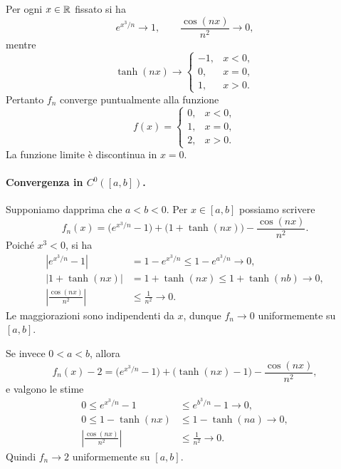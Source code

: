 \documentclass[a4paper]{article}
\begin{document}
\begin{radioactive}
\begin{snippetsolution}{}
Per ogni \(x\in\mathbb{R}\) fissato si ha
\[
	e^{x^3/n}\longrightarrow 1,
	\qquad
	\frac{\cos(nx)}{n^2}\longrightarrow 0,
\]
mentre
\[
	\tanh(nx)\longrightarrow
	\begin{cases}
		-1, & x<0,\\
		0, & x=0,\\
		1, & x>0.
	\end{cases}
\]
Pertanto \(f_n\) converge puntualmente alla funzione
\[
	f(x)=
	\begin{cases}
		0, & x<0,\\
		1, & x=0,\\
		2, & x>0.
	\end{cases}
\]
La funzione limite è discontinua in \(x=0\).

\begin{center}
\end{center}

\paragraph{Convergenza in \(C^0([a,b])\).}
Supponiamo dapprima che \(a<b<0\). Per \(x\in[a,b]\) possiamo scrivere
\[
	f_n(x)=\bigl(e^{x^3/n}-1\bigr)+\bigl(1+\tanh(nx)\bigr)-\frac{\cos(nx)}{n^2}.
\]
Poiché \(x^3<0\), si ha
\begin{align*}
	\left|e^{x^3/n}-1\right|
	&=1-e^{x^3/n}
	\leq 1-e^{a^3/n}
	\longrightarrow 0,\\
	|1+\tanh(nx)|
	&=1+\tanh(nx)
	\leq 1+\tanh(nb)
	\longrightarrow 0,\\
	\left|\frac{\cos(nx)}{n^2}\right|
	&\leq \frac{1}{n^2}
	\longrightarrow 0.
\end{align*}
Le maggiorazioni sono indipendenti da \(x\), dunque \(f_n\to 0\) uniformemente su \([a,b]\).

Se invece \(0<a<b\), allora
\[
	f_n(x)-2=\bigl(e^{x^3/n}-1\bigr)+\bigl(\tanh(nx)-1\bigr)-\frac{\cos(nx)}{n^2},
\]
e valgono le stime
\begin{align*}
	0\leq e^{x^3/n}-1&\leq e^{b^3/n}-1\longrightarrow 0,\\
	0\leq 1-\tanh(nx)&\leq 1-\tanh(na)\longrightarrow 0,\\
	\left|\frac{\cos(nx)}{n^2}\right|&\leq\frac{1}{n^2}\longrightarrow 0.
\end{align*}
Quindi \(f_n\to 2\) uniformemente su \([a,b]\).


\end{snippetsolution}
\end{radioactive}
\end{document}
